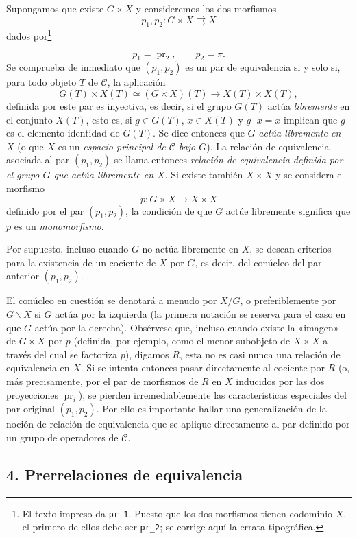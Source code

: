 \documentclass[11pt,twoside,openany]{book}
\numberwithin{equation}{section}
\newcommand{\src}[1]{%
  \phantomsection\hypertarget{src:#1}{}%
  \marginpar{\raggedleft\footnotesize\sffamily #1}%
}
\theoremstyle{plain}
\theoremstyle{definition}
\theoremstyle{remark}
\newcommand{\FgaUnitKey}{frontmatter}
\renewcommand{\src}[1]{%
  \phantomsection\hypertarget{src:\FgaUnitKey:#1}{}%
  \marginpar{\raggedleft\footnotesize\sffamily #1}%
}
\theoremstyle{plain}
\theoremstyle{definition}
\theoremstyle{remark}
\begin{document}
Supongamos que existe $G\times X$ y consideremos los dos morfismos
\[
  p_1,p_2:G\times X\rightrightarrows X
\]
dados por\footnote{El texto impreso da \texttt{pr\_1}. Puesto que los dos
morfismos tienen codominio $X$, el primero de ellos debe ser
\texttt{pr\_2}; se corrige aquí la errata tipográfica.}
\src{105}
\[
  p_1=\operatorname{pr}_2,\qquad p_2=\pi.
\]
Se comprueba de inmediato que $(p_1,p_2)$ es un par de equivalencia si y solo
si, para todo objeto $T$ de $\mathcal C$, la aplicación
\[
  G(T)\times X(T)\simeq(G\times X)(T)
  \longrightarrow X(T)\times X(T),
\]
definida por este par es inyectiva, es decir, si el grupo $G(T)$ actúa
\emph{libremente} en el conjunto $X(T)$, esto es, si $g\in G(T)$,
$x\in X(T)$ y $g\cdot x=x$ implican que $g$ es el elemento identidad de
$G(T)$. Se dice entonces que $G$ \emph{actúa libremente en $X$} (o que $X$ es
un \emph{espacio principal de $\mathcal C$ bajo $G$}). La relación de
equivalencia asociada al par $(p_1,p_2)$ se llama entonces \emph{relación de
equivalencia definida por el grupo $G$ que actúa libremente en $X$}. Si existe
también $X\times X$ y se considera el morfismo
\[
  p:G\times X\longrightarrow X\times X
\]
definido por el par $(p_1,p_2)$, la condición de que $G$ actúe libremente
significa que $p$ es un \emph{monomorfismo}.

Por supuesto, incluso cuando $G$ no actúa libremente en $X$, se desean
criterios para la existencia de un cociente de $X$ por $G$, es decir, del
conúcleo del par anterior $(p_1,p_2)$.

El conúcleo en cuestión se denotará a menudo por $X/G$, o preferiblemente por
$G\backslash X$ si $G$ actúa por la izquierda (la primera notación se reserva
para el caso en que $G$ actúa por la derecha). Obsérvese que, incluso cuando
existe la «imagen» de $G\times X$ por $p$ (definida, por ejemplo, como el
menor subobjeto de $X\times X$ a través del cual se factoriza $p$), digamos
$R$, esta no es casi nunca una relación de equivalencia en $X$. Si se intenta
entonces pasar directamente al cociente por $R$ (o, más precisamente, por el
par de morfismos de $R$ en $X$ inducidos por las dos proyecciones
$\operatorname{pr}_i$), se pierden irremediablemente las características
especiales del par original $(p_1,p_2)$. Por ello es importante hallar una
generalización de la noción de relación de equivalencia que se aplique
directamente al par definido por un grupo de operadores de $\mathcal C$.

\subsection*{4. Prerrelaciones de equivalencia}
\end{document}
